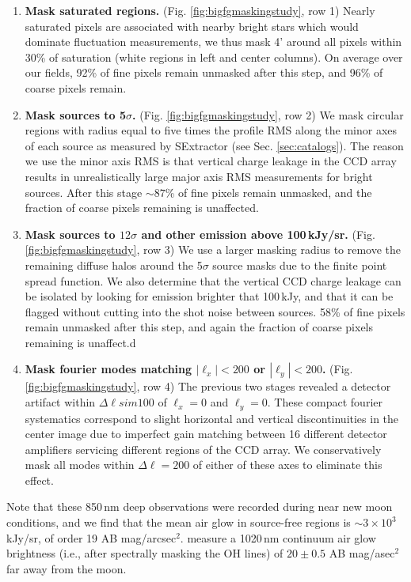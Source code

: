 \documentclass{emulateapj}
\begin{document}
\begin{enumerate}
	\item \textbf{Mask saturated regions.} (Fig. \ref{fig:bigfgmaskingstudy}, row 1) Nearly saturated pixels are associated with nearby bright stars which would dominate fluctuation measurements, we thus mask 4' around all pixels within 30\% of saturation (white regions in left and center columns). On average over our fields, 92\% of fine pixels remain unmasked after this step, and 96\% of coarse pixels remain.
	\item \textbf{Mask sources to 5$\sigma$.} (Fig. \ref{fig:bigfgmaskingstudy}, row 2) We mask circular regions with radius equal to five times the profile RMS along the minor axes of each source as measured by SExtractor (see Sec. \ref{sec:catalogs}). The reason we use the minor axis RMS is that vertical charge leakage in the CCD array results in unrealistically large major axis RMS measurements for bright sources. After this stage $\sim87$\% of fine pixels remain unmasked, and the fraction of coarse pixels remaining is unaffected.
	\item \textbf{Mask sources to $12\sigma$ and other emission above 100\,kJy/sr.} (Fig. \ref{fig:bigfgmaskingstudy}, row 3) We use a larger masking radius to remove the remaining diffuse halos around the 5$\sigma$ source masks due to the finite point spread function. We also determine that the vertical CCD charge leakage can be isolated by looking for emission brighter that 100\,kJy, and that it can be flagged without cutting into the shot noise between sources. 58\% of fine pixels remain unmasked after this step, and again the fraction of coarse pixels remaining is unaffect.d
	\item \textbf{Mask fourier modes matching $|\ell_x|<200$ or $|\ell_y|<200$.} (Fig. \ref{fig:bigfgmaskingstudy}, row 4) The previous two stages revealed a detector artifact within $\Delta\ell sim100$ of $\ell_x=0$ and $\ell_y=0$. These compact fourier systematics correspond to slight horizontal and vertical discontinuities in the center image due to imperfect gain matching between 16 different detector amplifiers servicing different regions of the CCD array. We conservatively mask all modes within $\Delta\ell=200$ of either of these axes to eliminate this effect.
\end{enumerate}

Note that these 850\,nm deep observations were recorded during near new moon conditions, and we find that the mean air glow in source-free regions is $\sim3\times10^3$ kJy/sr, of order 19 AB mag/arcsec$^2$. \citet{sullivan12} measure a 1020\,nm continuum air glow brightness (i.e., after spectrally masking the OH lines) of $20\pm0.5$ AB mag/asec$^2$ far away from the moon. 
\end{document}
